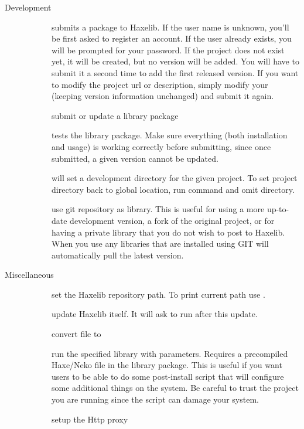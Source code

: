\begin{description}
	\item[Development]
		\begin{description}
			\item[] submits a package to Haxelib. If the user name is unknown, you'll be first asked to register an account. If the user already exists, you will be prompted for your password. If the project does not exist yet, it will be created, but no version will be added. You will have to submit it a second time to add the first released version. If you want to modify the project url or description, simply modify your  (keeping version information unchanged) and submit it again.
			\item[] submit or update a library package
			\item[] tests the library package. Make sure everything (both installation and usage) is working correctly before submitting, since once submitted, a given version cannot be updated.
			\item[] will set a development directory for the given project. To set project directory back to global location, run command and omit directory.
			\item[] use git repository as library. This is useful for using a more up-to-date development version, a fork of the original project, or for having a private library that you do not wish to post to Haxelib. When you use  any libraries that are installed using GIT will automatically pull the latest version.
		\end{description}
		
	\item[Miscellaneous]
		\begin{description}
			\item[] set the Haxelib repository path. To print current path use .
			\item[] update Haxelib itself. It will ask to run  after this update.
			\item[] convert  file to 
			\item[] run the specified library with parameters. Requires  a precompiled Haxe/Neko  file in the library package. This is useful if you want users to be able to do some post-install script that will configure some additional things on the system. Be careful to trust the project you are running since the script can damage your system.
			\item[] setup the Http proxy
		\end{description}
\end{description}
